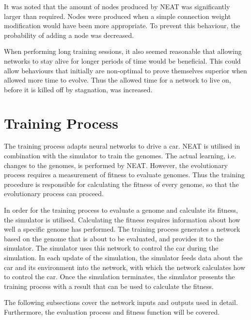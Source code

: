 It was noted that the amount of nodes produced by NEAT was significantly larger than required. Nodes were produced when a simple connection weight modification would have been more appropriate. To prevent this behaviour, the probability of adding a node was decreased.

When performing long training sessions, it also seemed reasonable that allowing networks to stay alive for longer periods of time would be beneficial. This could allow behaviours that initially are non-optimal to prove themselves superior when allowed more time to evolve. Thus the allowed time for a network to live on, before it is killed off by stagnation, was increased.



\section{Training Process}
The training process adapts neural networks to drive a car. NEAT is utilised in combination with the simulator to train the genomes. The actual learning, i.e. changes to the genomes, is performed by NEAT. However, the evolutionary process requires a measurement of fitness to evaluate genomes. Thus the training procedure is responsible for calculating the fitness of every genome, so that the evolutionary process can proceed. 

In order for the training process to evaluate a genome and calculate its fitness, the simulator is utilised. Calculating the fitness requires information about how well a specific genome has performed. The training process generates a network based on the genome that is about to be evaluated, and provides it to the simulator. The simulator uses this network to control the car during the simulation. In each update of the simulation, the simulator feeds data about the car and its environment into the network, with which the network calculates how to control the car. Once the simulation terminates, the simulator presents the training process with a result that can be used to calculate the fitness.

The following subsections cover the network inputs and outputs used in detail. Furthermore, the evaluation process and fitness function will be covered. 

